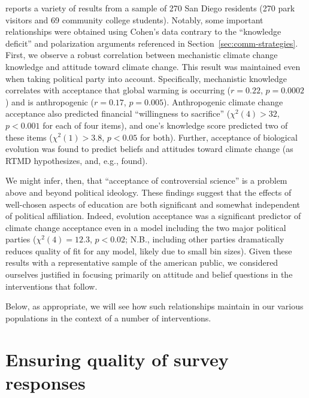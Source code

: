 \textcite{cohen_san_2012_f} reports a variety of results from a sample of 270
San Diego residents (270 park visitors and 69 community college students).
Notably, some important relationships were obtained using Cohen’s data contrary
to the “knowledge deficit” and polarization arguments referenced in
Section~\ref{sec:comm-strategies}. First, we observe a robust correlation
between mechanistic climate change knowledge and attitude toward climate change.
This result was maintained even when taking political party into account.
Specifically, mechanistic knowledge correlates with acceptance that global
warming is occurring ($r=0.22$, $p=0.0002$) and is anthropogenic ($r=0.17$,
$p=0.005$).  Anthropogenic climate change acceptance also predicted financial
“willingness to sacrifice” ($χ^2(4) > 32$, $p<0.001$ for each of four items),
and one’s knowledge score predicted two of these items ($χ^2(1) > 3.8$, $p<0.05$
for both). Further, acceptance of biological evolution was found to predict
beliefs and attitudes toward climate change (as RTMD hypothesizes, and, e.g.,
\cite{ranney_why_2012} found). 

We might infer, then, that “acceptance of controversial science” is a problem
above and beyond political ideology. These findings suggest that the effects of
well-chosen aspects of education are both significant and somewhat independent
of political affiliation. Indeed, evolution acceptance was a significant
predictor of climate change acceptance even in a model including the two major
political parties ($\chi^2(4)=12.3$, $p<0.02$; N.B., including other parties
dramatically reduces quality of fit for any model, likely due to small bin
sizes). Given these results with a representative sample of the american public,
we considered ourselves justified in focusing primarily on attitude and belief
questions in the interventions that follow.

Below, as appropriate, we will see how such relationships maintain
in our various populations in the context of a number of interventions.

% 

\section{Ensuring quality of survey responses}
\label{sec:attitude-quality}


